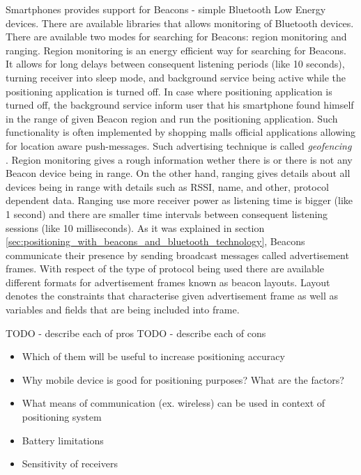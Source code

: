 \documentclass[../main.tex]{subfiles}
\begin{document}
Smartphones provides support for Beacons - simple Bluetooth Low Energy devices. There are available libraries that allows monitoring of Bluetooth devices. There are available two modes for searching for Beacons: region monitoring and ranging. Region monitoring is an energy efficient way for searching for Beacons. It allows for long delays between consequent listening periods (like 10 seconds), turning receiver into sleep mode, and background service being active while the positioning application is turned off. In case where positioning application is turned off, the background service inform user that his smartphone found himself in the range of given Beacon region and run the positioning application. Such functionality is often implemented by shopping malls official applications allowing for location aware push-messages. Such advertising technique is called \textit{geofencing} \cite{beacon_rssi_analysis}. Region monitoring gives a rough information wether there is or there is not any Beacon device being in range. On the other hand, ranging gives details about all devices being in range with details such as RSSI, name, and other, protocol dependent data. Ranging use more receiver power as listening time is bigger (like 1 second) and there are smaller time intervals between consequent listening sessions (like 10 milliseconds). As it was explained in section \ref{sec:positioning_with_beacons_and_bluetooth_technology}, Beacons communicate their presence by sending broadcast messages called advertisement frames. With respect of the type of protocol being used there are available different formats for advertisement frames known as beacon layouts. Layout denotes the constraints that characterise given advertisement frame as well as variables and fields that are being included into frame.

TODO - describe each of pros
TODO - describe each of cons


\begin{itemize}
	\item Which of them will be useful to increase positioning accuracy
	\item Why mobile device is good for positioning purposes? What are the factors?
	\item What means of communication (ex. wireless) can be used in context of positioning system
	\item Battery limitations
	\item Sensitivity of receivers
\end{itemize}
\end{document}

